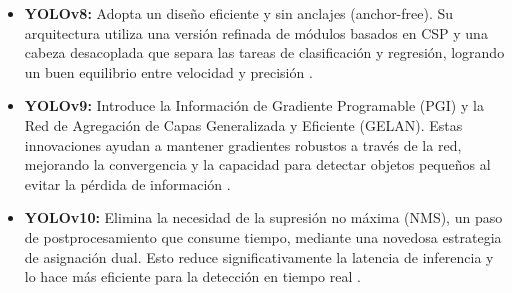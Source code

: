 \documentclass[12pt,a4paper,onecolumn,oneside]{report}
\begin{document}
\begin{itemize}
  \item \textbf{YOLOv8:} Adopta un diseño eficiente y sin anclajes (anchor-free). Su arquitectura utiliza una versión refinada de módulos basados en CSP y una cabeza desacoplada que separa las tareas de clasificación y regresión, logrando un buen equilibrio entre velocidad y precisión \cite{defyolos}.
  \item \textbf{YOLOv9:} Introduce la Información de Gradiente Programable (PGI) y la Red de Agregación de Capas Generalizada y Eficiente (GELAN). Estas innovaciones ayudan a mantener gradientes robustos a través de la red, mejorando la convergencia y la capacidad para detectar objetos pequeños al evitar la pérdida de información \cite{defyolos}.
  \item \textbf{YOLOv10:} Elimina la necesidad de la supresión no máxima (NMS), un paso de postprocesamiento que consume tiempo, mediante una novedosa estrategia de asignación dual. Esto reduce significativamente la latencia de inferencia y lo hace más eficiente para la detección en tiempo real \cite{defyolos}.
\end{itemize}
\end{document}
